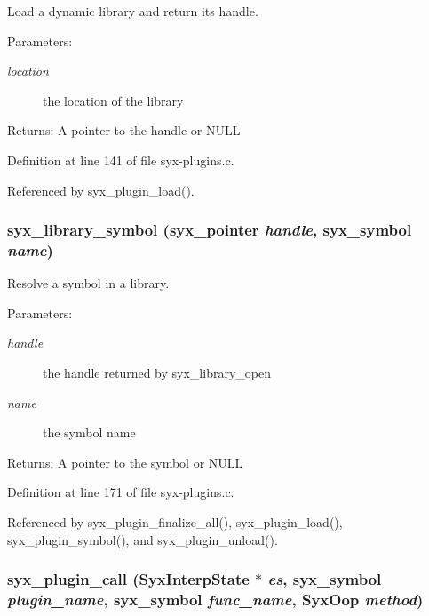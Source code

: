 Load a dynamic library and return its handle.

\begin{Desc}
\item[Parameters:]
\begin{description}
\item[{\em location}]the location of the library \end{description}
\end{Desc}
\begin{Desc}
\item[Returns:]A pointer to the handle or NULL \end{Desc}


Definition at line 141 of file syx-plugins.c.

Referenced by syx\_\-plugin\_\-load().\hypertarget{syx-plugins_8c_8657d2487cbbf5b77f3956c3056a4790}{
\subsubsection{ syx\_\-library\_\-symbol ({\bf syx\_\-pointer} {\em handle}, \/  {\bf syx\_\-symbol} {\em name})}}
\label{syx-plugins_8c_8657d2487cbbf5b77f3956c3056a4790}


Resolve a symbol in a library.

\begin{Desc}
\item[Parameters:]
\begin{description}
\item[{\em handle}]the handle returned by syx\_\-library\_\-open \item[{\em name}]the symbol name \end{description}
\end{Desc}
\begin{Desc}
\item[Returns:]A pointer to the symbol or NULL \end{Desc}


Definition at line 171 of file syx-plugins.c.

Referenced by syx\_\-plugin\_\-finalize\_\-all(), syx\_\-plugin\_\-load(), syx\_\-plugin\_\-symbol(), and syx\_\-plugin\_\-unload().\hypertarget{syx-plugins_8c_5ab057c34bb472f81221770f79b90664}{
\subsubsection{ syx\_\-plugin\_\-call ({\bf SyxInterpState} $\ast$ {\em es}, \/  {\bf syx\_\-symbol} {\em plugin\_\-name}, \/  {\bf syx\_\-symbol} {\em func\_\-name}, \/  {\bf SyxOop} {\em method})}}
\label{syx-plugins_8c_5ab057c34bb472f81221770f79b90664}


